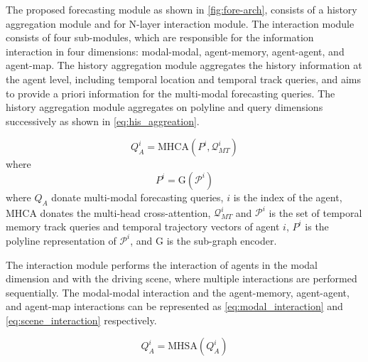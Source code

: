 
The proposed forecasting module as shown in \cref{fig:fore-arch}, consists of a history aggregation module and for N-layer interaction module. The interaction module consists of four sub-modules, which are responsible for the information interaction in four dimensions: modal-modal, agent-memory, agent-agent, and agent-map. The history aggregation module aggregates the history information at the agent level, including temporal location and temporal track queries, and aims to provide a priori information for the multi-modal forecasting queries. The history aggregation module aggregates on polyline and query dimensions successively as shown in \cref{eq:his_aggreation}.

\begin{equation}
  Q_A^i = \text{MHCA}(P^i, \mathcal{Q}_{MT}^i)
  \label{eq:his_aggreation}
\end{equation}
where
\begin{equation}
  P^i = \text{G}(\mathcal{P}^i)
  \label{eq:his_aggreation}
\end{equation}
where $Q_A$ donate multi-modal forecasting queries, $i$ is the index of the agent, MHCA donates the multi-head cross-attention, $\mathcal{Q}_{MT}^i$ and $\mathcal{P}^i$ is the set of temporal memory track queries and temporal trajectory vectors of agent $i$,  $P^i$ is the polyline representation of $\mathcal{P}^i$, and $\text{G}$ is the sub-graph encoder\cite{gao2020vectornet}. 

The interaction module performs the interaction of agents in the modal dimension and with the driving scene, where multiple interactions are performed sequentially. The modal-modal interaction and the agent-memory, agent-agent, and agent-map interactions can be represented as \cref{eq:modal_interaction} and \cref{eq:scene_interaction} respectively.

\begin{equation}
  Q_A^i = \text{MHSA}(Q_A^i)
  \label{eq:modal_interaction}
\end{equation}

